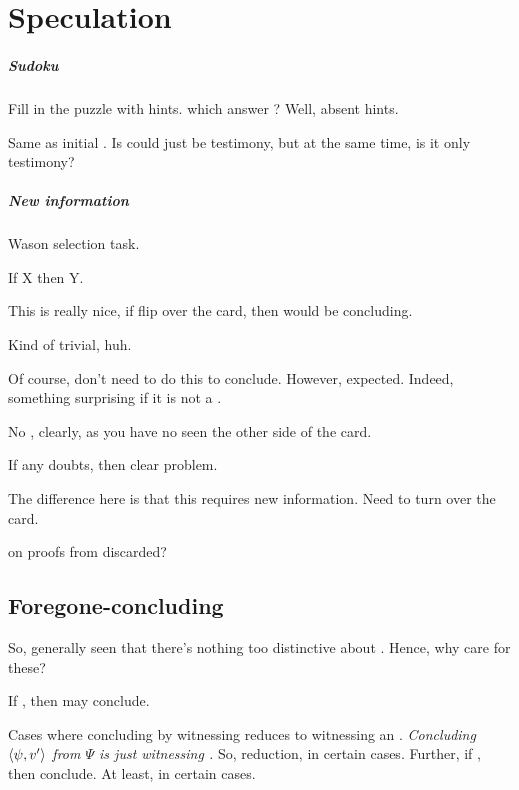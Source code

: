 \chapter{Speculation}
\label{cha:speculation}

\paragraph{Sudoku}

\begin{note}
  Fill in the puzzle with hints.
   which answer \qWhyV{}?
  Well, absent hints.

  Same as initial .
  Is could just be testimony, but at the same time, is it only testimony?
\end{note}

\paragraph{New information}

\begin{note}
  \begin{scenario}
    Wason selection task.

    If X then Y.
  \end{scenario}

  This is really nice, if flip over the card, then would be concluding.

  Kind of trivial, huh.

  Of course, don't need to do this to conclude.
  However, expected.
  Indeed, something surprising if it is not a \fc{}.

  No \wit{}, clearly, as you have no seen the other side of the card.

  If any doubts, then clear problem.

  The difference here is that this requires new information.
  Need to turn over the card.
\end{note}

\begin{note}
  \citeauthor{Easwaran:2009tm} on proofs from discarded?
\end{note}

\section{Foregone-concluding}

\begin{note}
  So, generally seen that there's nothing too distinctive about .
  Hence, why care for these?

  \begin{idea}
    \label{idea:reassignment}
    If \fc{}, then may conclude.
  \end{idea}

  Cases where concluding by witnessing reduces to witnessing an \fc{}.
  \emph{Concluding \(\langle \psi, v' \rangle\) from \(\Psi\) is just witnessing \fc{}.}
  So, reduction, in certain cases.
  Further, if \fc{}, then conclude.
  At least, in certain cases.
\end{note}


